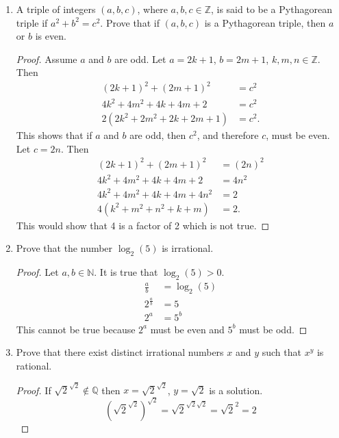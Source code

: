 \documentclass[12pt,a4paper,reqno,parskip=full]{amsart}
\numberwithin{equation}{section}
\theoremstyle{plain}
\theoremstyle{definition}
\begin{document}
\begin{enumerate}
  \item A triple of integers $(a,b,c)$, where $a,b,c\in\mathbb{Z}$, is said to be a Pythagorean triple if $a^2+b^2=c^2$. Prove that if $(a,b,c)$ is a Pythagorean triple, then $a$ or $b$ is even.
        \begin{proof}
          Assume $a$ and $b$ are odd. Let $a = 2k + 1$, $b = 2m + 1$, $k,m,n\in\mathbb{Z}$. Then
          \begin{align*}
            (2k + 1)^2 + (2m + 1)^2      & = c^2 \\
            4k^2 + 4m^2 + 4k + 4m + 2    & = c^2 \\
            2(2k^2 + 2m^2 + 2k + 2m + 1) & = c^2.
          \end{align*}
          This shows that if $a$ and $b$ are odd, then $c^2$, and therefore $c$, must be even. Let $c = 2n$. Then
          \begin{align*}
            (2k + 1)^2 + (2m + 1)^2    & = (2n)^2 \\
            4k^2 + 4m^2 + 4k + 4m + 2  & = 4n^2     \\
            4k^2 + 4m^2 + 4k + 4m + 4n^2 & = 2      \\
            4(k^2 + m^2 + n^2 + k + m)   & = 2.
          \end{align*}
          This would show that 4 is a factor of 2 which is not true.
        \end{proof}

  \item Prove that the number $\log_2(5)$ is irrational.
        \begin{proof}
          Let $a,b\in\mathbb{N}$. It is true that $\log_2(5) > 0$.
          \begin{align*}
            \frac{a}{b}     & =\log_2(5) \\
            2^{\frac{a}{b}} & = 5        \\
            2^a             & = 5^b
          \end{align*}
          This cannot be true because $2^a$ must be even and $5^b$ must be odd.
        \end{proof}

  \item Prove that there exist distinct irrational numbers $x$ and $y$ such that $x^y$ is rational.
        \begin{proof}
          If $\sqrt{2}^{\sqrt{2}}\notin\mathbb{Q}$ then $x = \sqrt{2}^{\sqrt{2}}$, $y = \sqrt{2}$ is a solution.
          \[
            \left(\sqrt{2}^{\sqrt{2}}\right)^{\sqrt{2}} = \sqrt{2}^{\sqrt{2}\sqrt{2}} = \sqrt{2}^2 = 2
          \]


\end{proof}
\end{enumerate}
\end{document}
